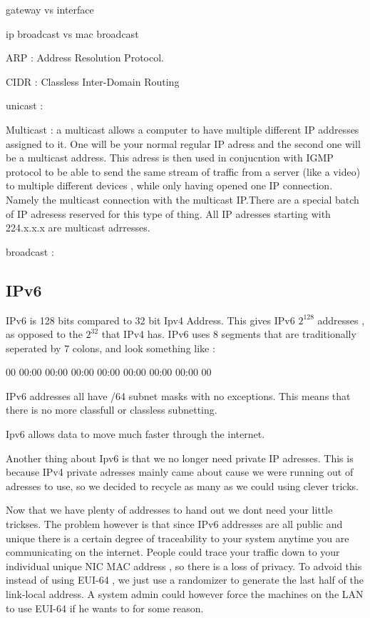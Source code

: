


gateway vs interface

ip broadcast vs mac broadcast

ARP : Address Resolution Protocol.

CIDR : Classless Inter-Domain Routing

unicast :

Multicast : a multicast allows a computer to have multiple different IP
addresses assigned to it. One will be your normal regular IP adress and the
second one will be a multicast address. This adress is then used in conjucntion
with IGMP protocol to be able to send the same stream of traffic from a server
(like a video) to multiple different devices , while only having opened one IP
connection. Namely the multicast connection with the multicast IP.There are a
special batch of IP adresess reserved for this type of thing.  All IP adresses
starting with 224.x.x.x are multicast adrresses.

broadcast :

\subsectionend

\subsection{IPv6}
\label{ssec:ipv6}

IPv6 is 128 bits compared to 32 bit Ipv4 Address. This gives IPv6 $ 2^{128} $
addresses , as opposed to the $ 2^{32} $ that IPv4 has. IPv6 uses 8 segments
that are traditionally seperated by 7 colons, and look something like :

 00 00:00 00:00 00:00 00:00 00:00 00:00 00:00 00

IPv6 addresses all have /64 subnet masks with no exceptions. This means that
there is no more classfull or classless subnetting.

Ipv6 allows data to move much faster through the internet.

Another thing about Ipv6 is that we no longer need private IP adresses. This is
because IPv4 private adresses mainly came about cause we were running out of
adresses to use, so we decided to recycle as many as we could using clever
tricks.

Now that we have plenty of addresses to hand out we dont need your little
trickses. The problem however is that since IPv6 addresses are all public and
unique there is a certain degree of traceability to your system anytime you are
communicating on the internet. People could trace your traffic down to your
individual unique NIC MAC address , so there is a loss of privacy. To advoid
this instead of using EUI-64 , we just use a randomizer to generate the last
half of the link-local address. A system admin could however force the machines
on the LAN to use EUI-64 if he wants to for some reason.



